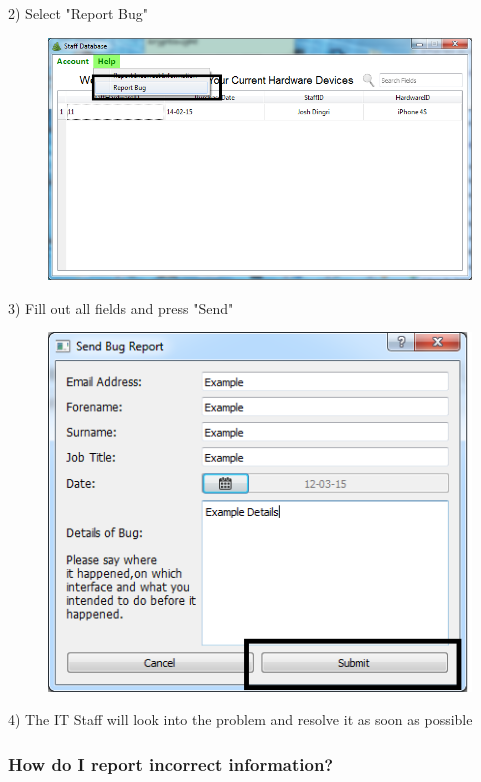 2) Select "Report Bug"


\begin{figure}[H]
    \includegraphics[width=\textwidth]{./Manual/Images/bugreport2.png}
\end{figure}


3) Fill out all fields and press "Send"


\begin{figure}[H]
    \includegraphics[width=\textwidth]{./Manual/Images/bugreport3.png}
\end{figure}


4) The IT Staff will look into the problem and resolve it as soon as possible

\subsubsection{How do I report incorrect information?}

